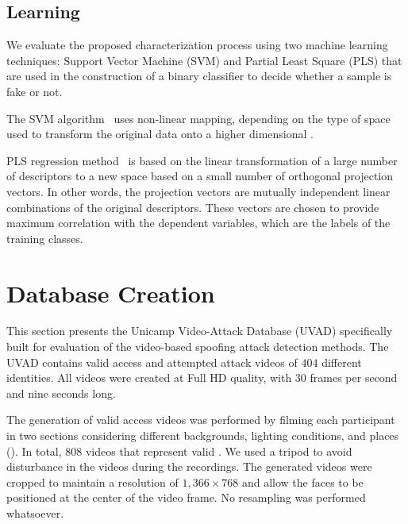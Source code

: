 \documentclass[journal]{IEEEtran}
\providecommand{\rv}[1]{{\protect\color{black}{#1}}}
\providecommand{\bmark}[1]{{\protect\color{black}{#1}}}
\begin{document}
\subsection{Learning}
We evaluate the proposed characterization process using two machine learning techniques: Support Vector Machine (SVM) and Partial Least Square (PLS) that are used in the construction of a binary classifier to decide whether a sample is fake or not. 

The SVM algorithm~\cite{Cortes:ML:1995} uses \rv{either a linear or a }non-linear mapping, depending on the type of space used to transform the original data onto a higher dimensional \rv{one}. %

PLS regression method~\cite{Hoskuldsson_1988} is based on the linear transformation of a large number of descriptors to a new space based on a small number of orthogonal projection vectors. In other words, the projection vectors are mutually independent linear combinations of the original descriptors. These vectors are chosen to provide maximum correlation with the dependent variables, which are the labels of the training classes.

\section{Database Creation}
\label{sec:DatabaseCreation}

This section presents the Unicamp Video-Attack Database (UVAD) specifically built for evaluation of the video-based spoofing attack detection methods. The UVAD contains valid access and attempted attack videos of $404$ different identities. All videos were created at Full HD quality, with $30$ frames per second and \rv{are} nine seconds long.

The generation of valid access videos was performed by filming each participant in two sections considering different backgrounds, lighting conditions, and places (\rv{indoors and outdoors}). \bmark{As each person is recorded by only one camera, then there is no identity overlap between video from different camera.} In total, $808$ videos that represent valid \rv{accesses were generated with six different cameras: a $9.1$ megapixels Sony CyberShot DSC-HX1, a $10.0$ megapixels Canon PowerShot SX1 IS, a $10.3$ megapixels Nikon Coolpix P100, a $14.0$ megapixels Kodak Z981, a $14.0$ megapixels Olympus SP 800UZ, and a $12.1$ megapixels Panasonic FZ35 digital camera}. We used a tripod to avoid disturbance in the videos during the recordings. The generated videos were cropped to maintain a resolution of $1,366 \times 768$ and allow the faces to be positioned at the center of the video frame. No resampling was performed whatsoever.
\end{document}
